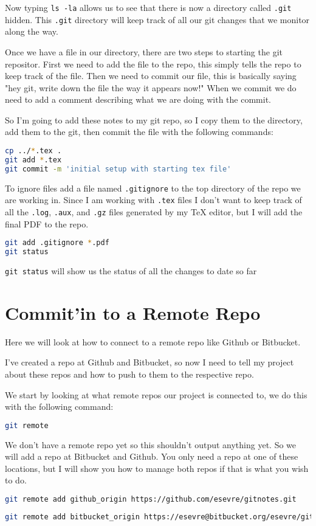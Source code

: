 \documentclass[a4paper]{spie} %
\begin{document}
Now typing \texttt{ls -la} allows us to see that there is now a directory called \texttt{.git} hidden. This \texttt{.git} directory will keep track of all our git changes that we monitor along the way.

Once we have a file in our directory, there are two steps to starting the git repositor. First we need to add the file to the repo, this simply tells the repo to keep track of the file. Then we need to commit our file, this is basically saying "hey git, write down the file the way it appears now!" When we commit we do need to add a comment describing what we are doing with the commit.

So I'm going to add these notes to my git repo, so I copy them to the directory, add them to the git, then commit the file with the following commands:
\begin{lstlisting}[language=bash]
cp ../*.tex .
git add *.tex
git commit -m 'initial setup with starting tex file'
\end{lstlisting}



To ignore files add a file named \texttt{.gitignore} to the top directory of the repo we are working in. Since I am working with \texttt{.tex} files I don't want to keep track of all the \texttt{.log}, \texttt{.aux}, and \texttt{.gz} files generated by my TeX editor, but I will add the final PDF to the repo.
\begin{lstlisting}[language=bash]
git add .gitignore *.pdf
git status
\end{lstlisting}

\texttt{git status} will show us the status of all the changes to date so far



\section*{Commit'in to a Remote Repo}
Here we will look at how to connect to a remote repo like Github or Bitbucket. 

I've created a repo at Github and Bitbucket, so now I need to tell my project about these repos and how to push to them to the respective repo.

We start by looking at what remote repos our project is connected to, we do this with the following command:
\begin{lstlisting}[language=bash]
git remote
\end{lstlisting}

We don't have a remote repo yet so this shouldn't output anything yet. So we will add a repo at Bitbucket and Github. You only need a repo at one of these locations, but I will show you how to manage both repos if that is what you wish to do.


\begin{lstlisting}[language=bash]
git remote add github_origin https://github.com/esevre/gitnotes.git
\end{lstlisting}
\begin{lstlisting}[language=bash]
git remote add bitbucket_origin https://esevre@bitbucket.org/esevre/gitnotes.git
\end{lstlisting}
\end{document}
